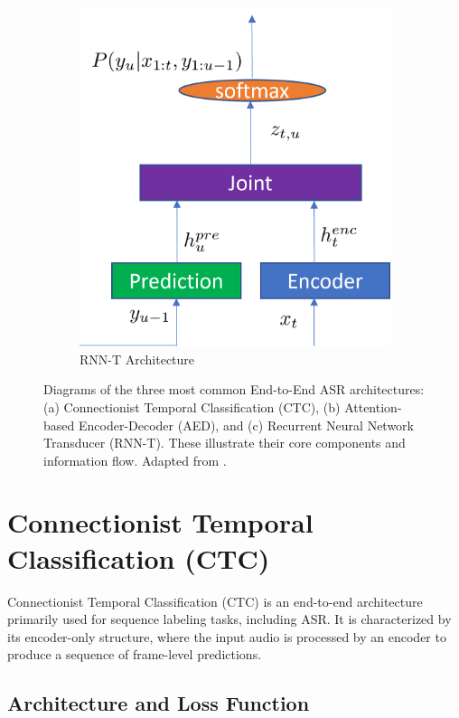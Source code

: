 \begin{figure}[h!]
\begin{subfigure}[b]{0.38\textwidth}
        \includegraphics[width=\linewidth]{obrazky-figures/archs/RNNT.png}
        \caption{RNN-T Architecture}
        \label{fig:rnnt_arch}
    \end{subfigure}
    \caption{Diagrams of the three most common End-to-End ASR architectures: (a) Connectionist Temporal Classification (CTC), (b) Attention-based Encoder-Decoder (AED), and (c) Recurrent Neural Network Transducer (RNN-T). These illustrate their core components and information flow. Adapted from \cite{Li_2022}.}
    \label{fig:e2e_architectures}
\end{figure}


\section{Connectionist Temporal Classification (CTC)}\label{ctc_theory}

Connectionist Temporal Classification (CTC) \cite{graves2006connectionist} is an end-to-end architecture primarily used for sequence labeling tasks, including ASR. It is characterized by its encoder-only structure, where the input audio is processed by an encoder to produce a sequence of frame-level predictions.

\subsection{Architecture and Loss Function}

